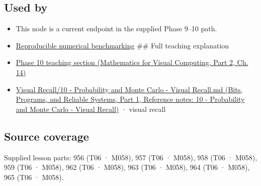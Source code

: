 \subsection{Used by}\label{appendix-bcc44e9d3d02-used-by}

\hypertarget{appendix-bcc44e9d3d02-used-by}{}

\begin{itemize}
\item
  This node is a current endpoint in the supplied Phase 9--10 path.
\item
  \hyperref[appendix-b9db93e28371]{Reproducible numerical benchmarking} \#\# Full teaching explanation
\item
  \href{../02-Mathematics-for-Visual-Computing-P02/main.pdf\#nameddest=02-foundations-ii-ch030-inference-and-error-metrics-need-explicit-assumptions}{Phase 10 teaching section (Mathematics for Visual Computing, Part 2, Ch. 14)}
\item
  \href{../01-Bits-Programs-and-Reliable-Systems-P01/main.pdf\#nameddest=appendix-cb5af353ef77}{Visual Recall/10 - Probability and Monte Carlo - Visual Recall.md (Bits, Programs, and Reliable Systems, Part 1, Reference notes: 10 - Probability and Monte Carlo - Visual Recall)} · visual recall
\end{itemize}

\subsection{Source coverage}\label{appendix-bcc44e9d3d02-source-coverage}

\hypertarget{appendix-bcc44e9d3d02-source-coverage}{}

Supplied lesson parts: 956 (T06 · M058), 957 (T06 · M058), 958 (T06 · M058), 959 (T06 · M058), 962 (T06 · M058), 963 (T06 · M058), 964 (T06 · M058), 965 (T06 · M058).
